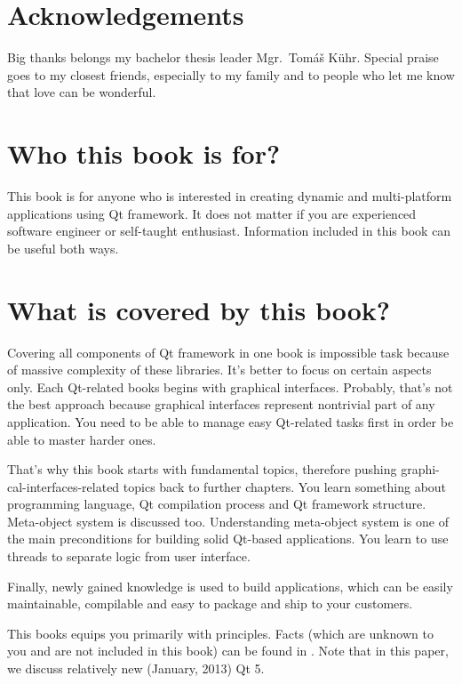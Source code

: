 \section*{Acknowledgements}
Big thanks belongs my bachelor thesis leader Mgr.~Tomáš Kühr. Special praise goes to my closest friends, especially to my family and to people who let me know that love can be wonderful.

\clearpage

\section*{Who this book is for?}
This book is for anyone who is interested in creating dynamic and multi-platform applications using Qt framework. It does not matter if you are experienced software engineer or self-taught enthusiast. Information included in this book can be useful both ways.

\section*{What is covered by this book?}
Covering all components of Qt framework in one book is impossible task because of massive complexity of these libraries. It's better to focus on certain aspects only. Each Qt-related books begins with graphical interfaces. Probably, that's not the best approach because graphical interfaces represent nontrivial part of any application. You need to be able to manage easy Qt-related tasks first in order be able to master harder ones.

That's why this book starts with fundamental topics, therefore pushing graphi-cal-interfaces-related topics back to further chapters. You learn something about \cpp programming language, Qt compilation process and Qt framework structure. Meta-object system is discussed too. Understanding meta-object system is one of the main preconditions for building solid Qt-based applications. You learn to use threads to separate logic from user interface.

Finally, newly gained knowledge is used to build applications, which can be easily maintainable, compilable and easy to package and ship to your customers.

This books equips you primarily with principles. Facts (which are unknown to you and are not included in this book) can be found in \citep{various:qtdoc}. Note that in this paper, we discuss relatively new (January, 2013) Qt 5.


